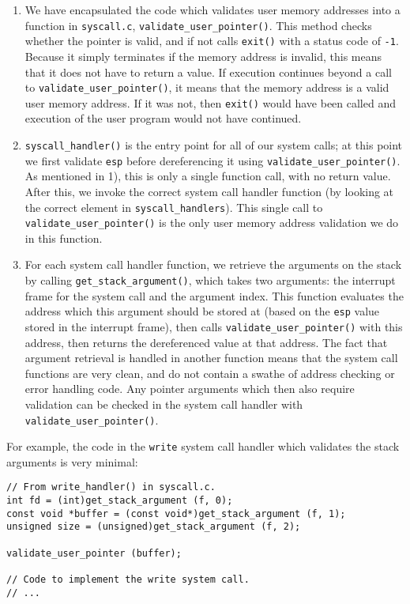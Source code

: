 \documentclass[a4wide, 11pt]{article}
\newcommand{\tx}{\texttt}
\begin{document}
\begin{enumerate}
\item We have encapsulated the code which validates user memory addresses into a function in \tx{syscall.c}, \tx{validate\_user\_pointer()}. This method checks whether the pointer is valid, and if not calls \tx{exit()} with a status code of \tx{-1}. Because it simply terminates if the memory address is invalid, this means that it does not have to return a value. If execution continues beyond a call to \tx{validate\_user\_pointer()}, it means that the memory address is a valid user memory address. If it was not, then \tx{exit()} would have been called and execution of the user program would not have continued.
\item \tx{syscall\_handler()} is the entry point for all of our system calls; at this point we first validate \tx{esp} before dereferencing it using \tx{validate\_user\_pointer()}. As mentioned in 1), this is only a single function call, with no return value. After this, we invoke the correct system call handler function (by looking at the correct element in \tx{syscall\_handlers}). This single call to \tx{validate\_user\_pointer()} is the only user memory address validation we do in this function.
\item For each system call handler function, we retrieve the arguments on the stack by calling \tx{get\_stack\_argument()}, which takes two arguments: the interrupt frame for the system call and the argument index. This function evaluates the address which this argument should be stored at (based on the \tx{esp} value stored in the interrupt frame), then calls \tx{validate\_user\_pointer()} with this address, then returns the dereferenced value at that address. The fact that argument retrieval is handled in another function means that the system call functions are very clean, and do not contain a swathe of address checking or error handling code. Any pointer arguments which then also require validation can be checked in the system call handler with \tx{validate\_user\_pointer()}.
\end{enumerate}

For example, the code in the \tx{write} system call handler which validates the stack arguments is very minimal:

\begin{verbatim}
// From write_handler() in syscall.c.
int fd = (int)get_stack_argument (f, 0);
const void *buffer = (const void*)get_stack_argument (f, 1);
unsigned size = (unsigned)get_stack_argument (f, 2);

validate_user_pointer (buffer);

// Code to implement the write system call.
// ...
\end{verbatim}
\end{document}
